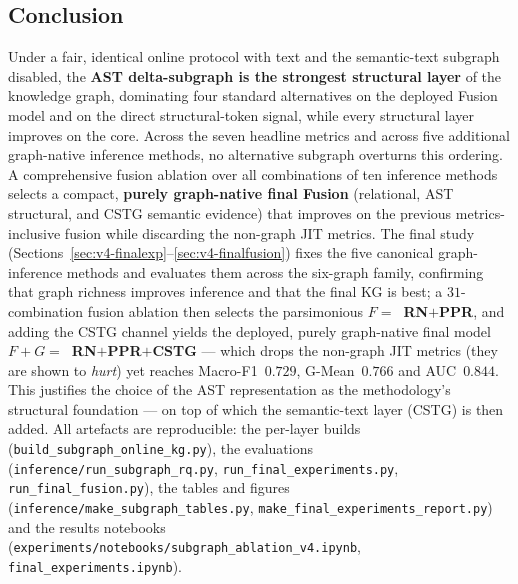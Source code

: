 \documentclass[11pt,a4paper]{article}
\newcommand{\code}[1]{\texttt{#1}}
\begin{document}
	\subsection{Conclusion}\label{sec:v4-concl}
	Under a fair, identical online protocol with text and the semantic-text
	subgraph disabled, the \textbf{AST delta-subgraph is the strongest structural
	layer} of the knowledge graph, dominating four standard alternatives on the
	deployed Fusion model and on the direct structural-token signal, while every
	structural layer improves on the core. Across the seven headline metrics and
	across five additional graph-native inference methods, no alternative subgraph
	overturns this ordering. A comprehensive fusion ablation over all combinations of
	ten inference methods selects a compact, \textbf{purely graph-native final Fusion}
	(relational, AST structural, and CSTG semantic evidence) that improves on the
	previous metrics-inclusive fusion while discarding the non-graph JIT metrics.
	The final study (Sections~\ref{sec:v4-finalexp}--\ref{sec:v4-finalfusion}) fixes
	the five canonical graph-inference methods and evaluates them across the six-graph
	family, confirming that graph richness improves inference and that the final KG is
	best; a $31$-combination fusion ablation then selects the parsimonious
	\textbf{$F=$~RN$+$PPR}, and adding the CSTG channel yields the deployed, purely
	graph-native final model \textbf{$F+G=$~RN$+$PPR$+$CSTG} --- which drops the
	non-graph JIT metrics (they are shown to \emph{hurt}) yet reaches Macro-F1~$0.729$,
	G-Mean~$0.766$ and AUC~$0.844$. This justifies the
	choice of the AST representation as the methodology's structural foundation ---
	on top of which the semantic-text layer (CSTG) is then added. All artefacts are
	reproducible: the per-layer builds (\code{build\_subgraph\_online\_kg.py}), the
	evaluations (\code{inference/run\_subgraph\_rq.py},
	\code{run\_final\_experiments.py}, \code{run\_final\_fusion.py}), the tables and
	figures (\code{inference/make\_subgraph\_tables.py},
	\code{make\_final\_experiments\_report.py}) and the results notebooks
	(\code{experiments/notebooks/subgraph\_ablation\_v4.ipynb},
	\code{final\_experiments.ipynb}).
\end{document}
